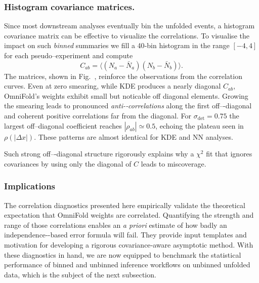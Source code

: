         \subsubsection{Histogram covariance matrices.}
            Since most downstream analyses eventually bin the unfolded events, a histogram covariance matrix can be effective to visualize the correlations.
            To visualise the impact on such \emph{binned} summaries we fill a 40‐bin histogram in the range $[-4,4]$ for each pseudo–experiment and compute
            \[
              C_{ab} = \bigl\langle
                         (N_a-\bar N_a)(N_b-\bar N_b)
                       \bigr\rangle.
            \]
            The matrices, shown in Fig.~, reinforce the observations from the correlation curves.
            Even at zero smearing, while KDE produces a nearly diagonal $C_{ab},$ OmniFold's weights exhibit small but noticable off diagonal elements.
            Growing the smearing leads to pronounced \emph{anti-‐correlations} along the first off–-diagonal and coherent positive correlations far from the diagonal.
            For $\sigma_{\det}=0.75$ the largest off–diagonal coefficient reaches $|\rho_{ab}|\simeq0.5$, echoing the plateau seen in $\rho(|\Delta x|)$.  These patterns are almost identical for {KDE} and {NN} analyses.

            Such strong off–-diagonal structure rigorously explains why a $\chi^2$ fit that {ignores} covariances by using only the diagonal of $C$ leads to miscoverage.
        \subsubsection{Implications}
            The correlation diagnostics presented here {empirically validate} the theoretical expectation that OmniFold weights are correlated.
            Quantifying the strength and range of those correlations enables an \emph{a priori} estimate of how badly an independence‐-based error formula will fail.
            They provide {input templates} and motivation for developing a rigorous covariance‐aware asymptotic method.
            With these diagnostics in hand, we are now equipped to benchmark the statistical performance of binned and unbinned inference workflows on unbinned unfolded data, which is the subject of the next subsection.
